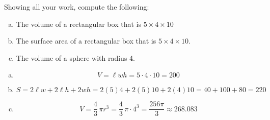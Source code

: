 \documentclass[11pt,letterpaper]{article}
\begin{document}
\newpage



 Showing all your work, compute the following:
	\begin{enumerate}[(a)]
	\item The volume of a rectangular box that is $5 \times 4 \times 10$
	\item The surface area of a rectangular box that is $5 \times 4 \times 10$.
	\item The volume of a sphere with radius 4.
	\end{enumerate} \pspace

\sol 
\begin{enumerate}[(a)]
\item 
	\[
	V= \ell w h= 5 \cdot 4 \cdot 10= 200
	\] \pspace

\item 
	\[
	S= 2 \ell w + 2 \ell h + 2 wh= 2(5)4 + 2(5)10 + 2(4)10= 40 + 100 + 80= 220
	\] \pspace

\item 
	\[
	V= \dfrac{4}{3}\, \pi r^3= \dfrac{4}{3} \, \pi \cdot 4^3= \dfrac{256 \pi}{3} \approx 268.083
	\]
\end{enumerate}
\end{document}
